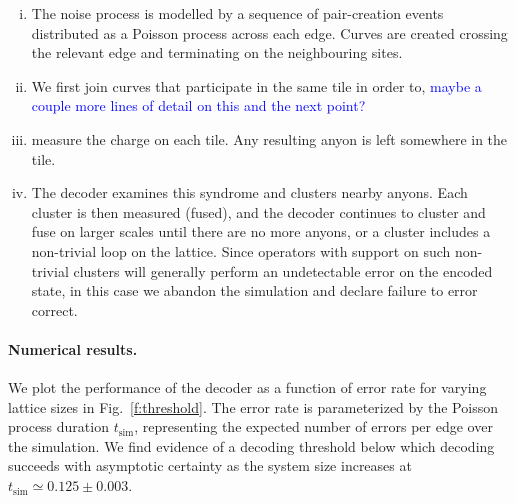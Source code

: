 \documentclass[aps, prl, letterpaper, twocolumn, superscriptaddress, notitlepage, 10pt]{revtex4-1}
\newcommand{\Fref}[1]{Fig.~\ref{#1}}
\newcommand{\cggb}[1]{\textcolor{blue}{#1}}
\begin{document}
\begin{enumerate}[i)]
\item The noise process is modelled by a sequence of pair-creation events distributed as 
a Poisson process across each edge. Curves are created crossing the relevant edge 
and terminating on the neighbouring sites.
\item We first join curves that participate in the same tile in order to, 
\cggb{maybe a couple more lines of detail on this and the next point?}
\item measure the charge on each tile. Any resulting anyon is left somewhere in the tile.
\item The decoder examines this syndrome and clusters nearby anyons. Each cluster 
is then measured (fused), and the decoder continues to cluster and fuse on larger 
scales until there are no more anyons, or a cluster includes a non-trivial loop on the 
lattice. Since operators with support on such non-trivial clusters will generally perform an 
undetectable error on the encoded state, in this case we abandon the simulation and 
declare failure to error correct.
\end{enumerate}

\paragraph{Numerical results.}

We plot the performance of the decoder as a function of error rate for varying lattice sizes in 
\Fref{f:threshold}. The error rate is parameterized by the Poisson process duration 
$t_{\mathrm{sim}}$, representing the expected number of errors per edge over the simulation. 
We find evidence of a decoding threshold below which decoding succeeds with asymptotic 
certainty as the system size increases at $t_{\mathrm{sim}}\simeq 0.125 \pm 0.003$.
\end{document}
